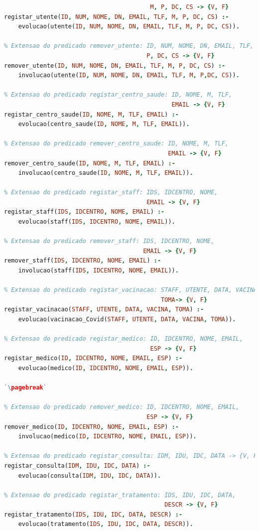 \documentclass[a4paper, 11pt]{article}
\begin{document}
\begin{lstlisting}[language=Prolog, caption={Predicados de registo e remoção de conhecimento}]
% Extensao do predicado registar_utente: ID, NUM, NOME, DN, EMAIL, TLF,
                                         M, P, DC, CS -> {V, F}
registar_utente(ID, NUM, NOME, DN, EMAIL, TLF, M, P, DC, CS) :- 
    evolucao(utente(ID, NUM, NOME, DN, EMAIL, TLF, M, P, DC, CS)).

% Extensao do predicado remover_utente: ID, NUM, NOME, DN, EMAIL, TLF, M,
                                        P, DC, CS -> {V, F}
remover_utente(ID, NUM, NOME, DN, EMAIL, TLF, M, P, DC, CS) :- 
    involucao(utente(ID, NUM, NOME, DN, EMAIL, TLF, M, P,DC, CS)).

% Extensao do predicado registar_centro_saude: ID, NOME, M, TLF,
                                               EMAIL -> {V, F}
registar_centro_saude(ID, NOME, M, TLF, EMAIL) :- 
    evolucao(centro_saude(ID, NOME, M, TLF, EMAIL)).

% Extensao do predicado remover_centro_saude: ID, NOME, M, TLF,
                                              EMAIL -> {V, F}
remover_centro_saude(ID, NOME, M, TLF, EMAIL) :- 
    involucao(centro_saude(ID, NOME, M, TLF, EMAIL)).

% Extensao do predicado registar_staff: IDS, IDCENTRO, NOME,
                                        EMAIL -> {V, F}
registar_staff(IDS, IDCENTRO, NOME, EMAIL) :- 
    evolucao(staff(IDS, IDCENTRO, NOME, EMAIL)).

% Extensao do predicado remover_staff: IDS, IDCENTRO, NOME,
                                       EMAIL -> {V, F}
remover_staff(IDS, IDCENTRO, NOME, EMAIL) :- 
    involucao(staff(IDS, IDCENTRO, NOME, EMAIL)).

% Extensao do predicado registar_vacinacao: STAFF, UTENTE, DATA, VACINA,
                                            TOMA-> {V, F}
registar_vacinacao(STAFF, UTENTE, DATA, VACINA, TOMA) :- 
    evolucao(vacinacao_Covid(STAFF, UTENTE, DATA, VACINA, TOMA)).

% Extensao do predicado registar_medico: ID, IDCENTRO, NOME, EMAIL,
                                         ESP -> {V, F}
registar_medico(ID, IDCENTRO, NOME, EMAIL, ESP) :- 
    evolucao(medico(ID, IDCENTRO, NOME, EMAIL, ESP)).

`\pagebreak`

% Extensao do predicado remover_medico: ID, IDCENTRO, NOME, EMAIL,
                                        ESP -> {V, F}
remover_medico(ID, IDCENTRO, NOME, EMAIL, ESP) :- 
    involucao(medico(ID, IDCENTRO, NOME, EMAIL, ESP)).

% Extensao do predicado registar_consulta: IDM, IDU, IDC, DATA -> {V, F}
registar_consulta(IDM, IDU, IDC, DATA) :- 
    evolucao(consulta(IDM, IDU, IDC, DATA)).

% Extensao do predicado registar_tratamento: IDS, IDU, IDC, DATA,
                                             DESCR -> {V, F}
registar_tratamento(IDS, IDU, IDC, DATA, DESCR) :- 
    evolucao(tratamento(IDS, IDU, IDC, DATA, DESCR)).
\end{lstlisting}
\end{document}
